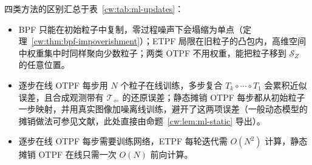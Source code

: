 四类方法的区别汇总于表~\ref{cw:tab:ml-updates}：
\begin{itemize}[leftmargin=2em,topsep=3pt,itemsep=2pt,parsep=0pt]
\item BPF 只能在初始粒子中复制，零过程噪声下会塌缩为单点（定理~\ref{cw:thm:bpf-impoverishment}）；ETPF 局限在旧粒子的凸包内，高维空间中权重集中时同样聚向少数粒子；两类 OTPF 不用权重，能把粒子移到 $\mathcal S_Z$ 的任意位置。
\item 逐步在线 OTPF 每步用 $N$ 个粒子在线训练，多步复合 $T_k\circ\cdots\circ T_1$ 会累积近似误差，且合成观测带有 $\mathscr T_{\Leftarrow}$ 的还原误差；静态摊销 OTPF 每步都从初始粒子一步映射，并用真实图像加噪离线训练，避开了这两项误差（一般动态模型的摊销做法可参见文献\cite{aljarrah2025aotf}，此处直接由命题~\ref{cw:lem:ml-static} 导出）。
\item 逐步在线 OTPF 每步需要训练网络，ETPF 每轮迭代需 $O(N^2)$ 计算，静态摊销 OTPF 在线只需一次 $O(N)$ 前向计算。
\end{itemize}

